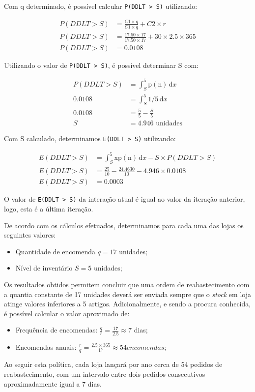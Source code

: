 \begin{itemize}
	Com q determinado, é possível calcular \texttt{P(DDLT > S)} utilizando:

	\begin{align*}	
	P(DDLT > S)&=\frac{C1 \times q}{C1 \times q}+C2 \times r\\
	P(DDLT > S)&=\frac{17.50 \times 17}{17.50 \times 17}+30 \times 2.5 \times 365\\
	P(DDLT > S)&=0.0108
	\end{align*}

	Utilizando o valor de \texttt{P(DDLT > S)}, é possível determinar S com:
	
	\begin{align*}	
	P(DDLT > S)&=\int_S^5 \mathrm{p(n)}\,\mathrm{d}x\\
	0.0108     &=\int_S^5 \mathrm{1/5}\,\mathrm{d}x\\
	0.0108     &=\frac{5}{5} - \frac{S}{5}\\
	S          &=4.946 \text{ unidades}
	\end{align*}

	Com S calculado, determinamos \texttt{E(DDLT > S)} utilizando:
	
	\begin{align*}	
		E(DDLT > S)&=\int_S^5 \mathrm{xp(n)}\,\mathrm{d}x - S \times P(DDLT
		> S)\\
		E(DDLT > S)&=\frac{25}{10} - \frac{24.4630}{10} - 4.946 \times 0.0108\\
	  E(DDLT > S)&= 0.0003
	\end{align*}

	O valor de \texttt{E(DDLT > S)} da interação atual é igual ao valor da iteração
	anterior, logo, esta é a última iteração.

\end{itemize}

De acordo com os cálculos efetuados, determinamos para cada uma das lojas os
seguintes valores:

\begin{itemize}
\item Quantidade de encomenda $q = 17$ unidades;
\item Nível de inventário $S = 5$ unidades;
\end{itemize}

Os resultados obtidos permitem concluir que uma ordem de reabastecimento com
a quantia constante de 17 unidades deverá ser enviada sempre que o \emph{stock} em loja
atinge valores inferiores a 5 artigos. Adicionalmente, e sendo a procura
conhecida, é possível calcular o valor aproximado de:

\begin{itemize}
\item Frequência de encomendas: $\frac{q}{r} = \frac{17}{2.5} \approx 7$ dias;
\item Encomendas anuais:        $\frac{r}{q} = \frac{2.5 \times 365}{17}
	\approx 54 encomendas$;
\end{itemize}

Ao seguir esta política, cada loja lançará por ano cerca de 54 pedidos de
reabastecimento, com um intervalo entre dois pedidos consecutivos
aproximadamente igual a 7 dias.   


